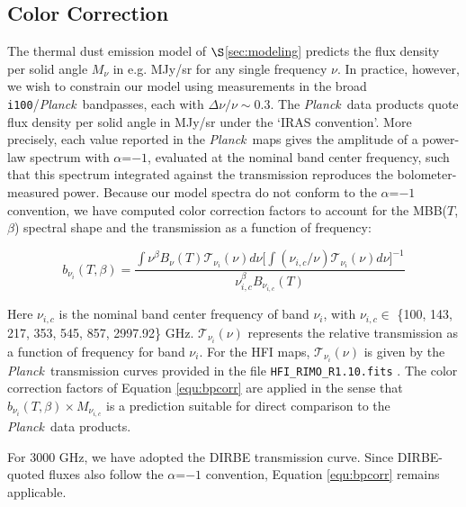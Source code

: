 \documentclass{emulateapj}
\newcommand{\PLANCK}{{\it Planck}}
\begin{document}
\subsection{Color Correction}
\label{sec:bpcorr}
The thermal dust emission model of $\S$\ref{sec:modeling} predicts the 
flux density per solid angle $M_{\nu}$ in e.g. MJy/sr for any single frequency 
$\nu$. In practice, however, we wish to constrain our model using measurements 
in the broad \verb|i100|/\PLANCK~bandpasses, each with $\Delta\nu/\nu\sim0.3$. 
The \PLANCK~data products quote flux density per solid angle in MJy/sr under 
the `IRAS convention'. More precisely, each value reported in the \PLANCK~maps 
gives the amplitude of a power-law spectrum with $\alpha$=$-1$, evaluated at 
the nominal band center frequency, such that this spectrum integrated against 
the transmission reproduces the bolometer-measured power. Because our model 
spectra do not conform to the $\alpha$=$-1$ convention, we have computed color 
correction factors to account for the MBB($T$, $\beta$) spectral shape and the 
transmission as a function of frequency:


\begin{equation} \label{equ:bpcorr}
b_{\nu_i}(T, \beta) = \frac{\int \nu^{\beta}B_{\nu}(T)\mathcal{T}_{\nu_i}(\nu) d\nu \bigg[\int (\nu_{i,c}/\nu)\mathcal{T}_{\nu_i}(\nu) d\nu\bigg]^{-1}}{\nu_{i,c}^{\beta}B_{\nu_{i,c}}(T)}
\end{equation}


Here $\nu_{i,c}$ is the nominal band center frequency of band $\nu_i$,  with 
$\nu_{i,c} \in$ \{100, 143, 217, 353, 545, 857, 2997.92\} GHz. 
$\mathcal{T}_{\nu_i}(\nu)$ represents the relative transmission as a function 
of frequency for band $\nu_i$. For the HFI maps, $\mathcal{T}_{\nu_i}(\nu)$ is 
given by the \PLANCK~transmission curves provided in the file 
\verb|HFI_RIMO_R1.10.fits| \citep{planckresponse}. The color correction factors
of Equation \ref{equ:bpcorr} are applied in the sense that 
$b_{\nu_i}(T ,\beta)\times M_{\nu_{i,c}}$ is a prediction suitable for 
direct comparison to the \PLANCK~data products.

For 3000 GHz, we have adopted the DIRBE transmission curve. Since DIRBE-quoted
fluxes also follow the $\alpha$=$-1$ convention, Equation \ref{equ:bpcorr}
remains applicable.
\end{document}

